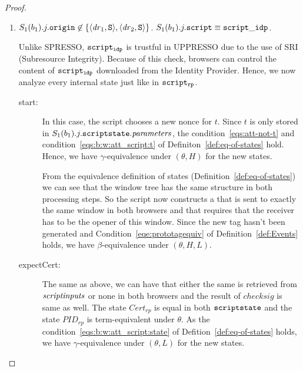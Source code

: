 \documentclass[letterpaper,onecolumn,10pt]{article}
\begin{document}
\begin{proof}
\begin{description}
\begin{description}
\begin{enumerate}

        \item $S_1(b_1).j.\mathtt{origin} \not\in 
          \{\langle\mathit{dr}_1,\mathtt{S}\rangle,\langle\mathit{dr}_2,\mathtt{S}\rangle\}$. 
          $S_1(b_1).j.\mathtt{script} \equiv \mathtt{script\_idp}$.
          
          Unlike SPRESSO, $\mathtt{script_{idp}}$ is trustful in
          UPPRESSO due to the use of SRI (Subresource Integrity).
          Because of this check, browsers can control the 
          content of $\mathtt{script_{idp}}$ downloaded from 
          the Identity Provider. Hence, we now analyze every 
          internal state just like in $\mathtt{script_{rp}}$.

          \begin{description}
          \item[start:] In this case, the script chooses a
            new nonce for $t$. Since $t$ is only stored in
            $S_1(b_1).j.\mathtt{scriptstate}.\mathit{parameters}$,
            the condition~\ref{eqs:att-not-t} and 
            condition~\ref{eqs:b:w:att_script:t} of 
            Definiton~\ref{def:eq-of-states} hold. Hence, 
            we have $\gamma$-equivalence under $(\theta,H)$ 
            for the new states.

            From the equivalence definition of states
            (Definition~\ref{def:eq-of-states}) we can see 
            that the window tree has the same structure in 
            both processing steps. 
            So the script now constructs a \pm that is sent to 
            exactly the same window in both browsers and that 
            requires that the receiver has to be the opener
            of this window. Since the new tag hasn't been 
            generated and Condition~\ref{eqe:prototagequiv} 
            of Definition~\ref{def:Events} holds, we have 
            $\beta$-equivalence under $(\theta,H,L)$.
          \item[expectCert:] The same as above, we can have 
            that either the same \pm is retrieved from 
            $\mathit{scriptinputs}$ or none in both browsers and 
            the result of $checksig$ is same as well. The 
            state $Cert_{rp}$ is equal in both 
            $\mathtt{scriptstate}$ and the state $PID_{rp}$ is
            term-equivalent under $\theta$. As the 
            condition~\ref{eqs:b:w:att_script:state} of 
            Defition~\ref{def:eq-of-states} holds, we have 
            $\gamma$-equivalence under $(\theta,L)$ for the 
            new states.


\end{description}
\end{enumerate}
\end{description}
\end{description}
\end{proof}
\end{document}
